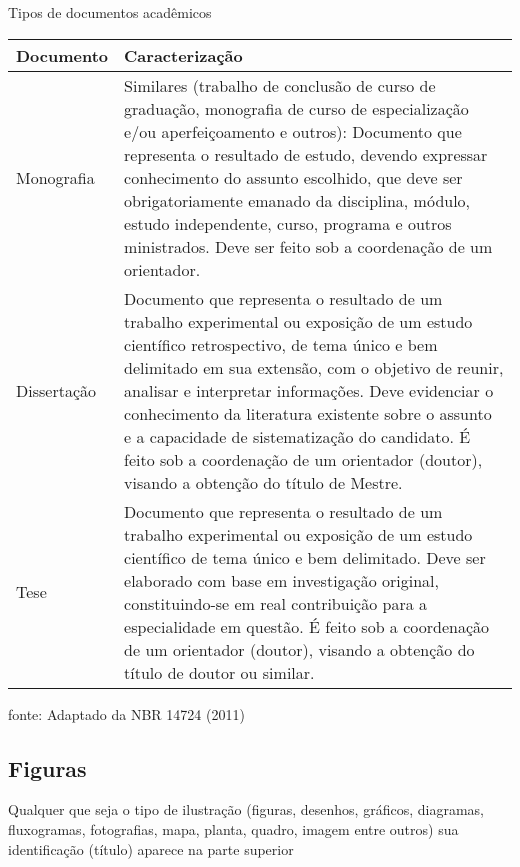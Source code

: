 \documentclass[
  12pt,		%
  a4paper,	%
  openright,%
  oneside,	%
  chapter=TITLE,		%
  section=TITLE,		%
  english,	%
  french,	%
  spanish,	%
  brazil	%
]{abntex2}
\begin{document}
                \begin{quadro}[h]
                    \centering
                    \caption{Tipos de documentos acadêmicos}
                    \label{quadroUm}
                    \begin{tabular}{|l|p{12cm}|}
                    \hline
                    Documento & Caracterização \\ \hline
                    Monografia  & Similares (trabalho de conclusão de curso de graduação, monografia de curso de especialização e/ou aperfeiçoamento e outros): Documento que representa o resultado de estudo, devendo expressar conhecimento do assunto escolhido, que deve ser obrigatoriamente emanado da disciplina, módulo, estudo independente, curso, programa e outros ministrados. Deve ser feito sob a coordenação de um orientador. \\ \hline
                    Dissertação & Documento que representa o resultado de um trabalho experimental ou exposição de um estudo científico retrospectivo, de tema único e bem delimitado em sua extensão, com o objetivo de reunir, analisar e interpretar informações. Deve evidenciar o conhecimento da literatura existente sobre o assunto e a capacidade de sistematização do candidato. É feito sob a coordenação de um orientador (doutor), visando a obtenção do título de Mestre. \\ \hline
                    Tese & Documento que representa o resultado de um trabalho experimental ou exposição de um estudo científico de tema único e bem delimitado. Deve ser elaborado com base em investigação original, constituindo-se em real contribuição para a especialidade em questão. É feito sob a coordenação de um orientador (doutor), visando a obtenção do título de doutor ou similar. \\ \hline
                    \end{tabular}
                    \par
                    {\small fonte: Adaptado da NBR 14724 (2011)}
                \end{quadro}

            \subsection {Figuras}
            
                Qualquer que seja o tipo de ilustração (figuras, desenhos, gráficos, diagramas, fluxogramas, fotografias, mapa, planta, quadro, imagem entre outros) sua identificação (título) aparece na parte superior
                
\end{document}
